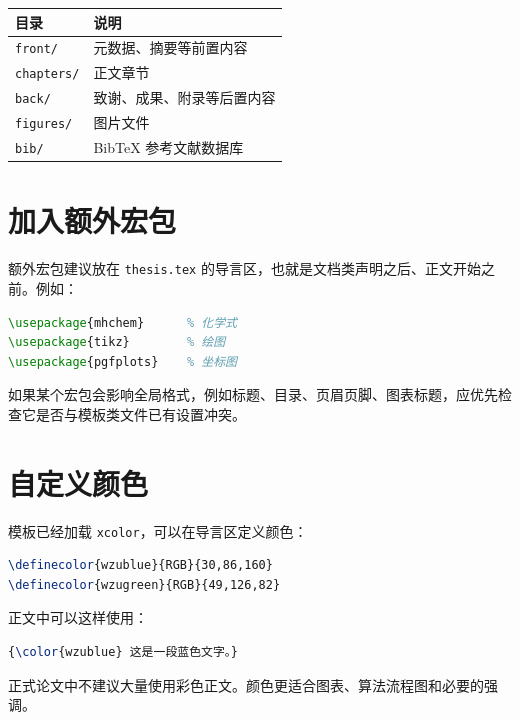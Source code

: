 \begin{table}[htbp]
  \centering
  \label{tab:directories}
  \begin{tabular}{ll}
    \toprule
    目录 & 说明 \\
    \midrule
    \texttt{front/} & 元数据、摘要等前置内容 \\
    \texttt{chapters/} & 正文章节 \\
    \texttt{back/} & 致谢、成果、附录等后置内容 \\
    \texttt{figures/} & 图片文件 \\
    \texttt{bib/} & BibTeX 参考文献数据库 \\
    \bottomrule
  \end{tabular}
\end{table}

\section{加入额外宏包}

额外宏包建议放在 \texttt{thesis.tex} 的导言区，也就是文档类声明之后、正文开始之前。例如：

\begin{lstlisting}[language=TeX]
\usepackage{mhchem}      % 化学式
\usepackage{tikz}        % 绘图
\usepackage{pgfplots}    % 坐标图
\end{lstlisting}

如果某个宏包会影响全局格式，例如标题、目录、页眉页脚、图表标题，应优先检查它是否与模板类文件已有设置冲突。

\section{自定义颜色}

模板已经加载 \texttt{xcolor}，可以在导言区定义颜色：

\begin{lstlisting}[language=TeX]
\definecolor{wzublue}{RGB}{30,86,160}
\definecolor{wzugreen}{RGB}{49,126,82}
\end{lstlisting}

正文中可以这样使用：

\begin{lstlisting}[language=TeX]
{\color{wzublue} 这是一段蓝色文字。}
\end{lstlisting}

正式论文中不建议大量使用彩色正文。颜色更适合图表、算法流程图和必要的强调。

